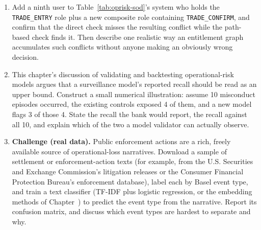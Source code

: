 \documentclass[../ai_in_finance]{subfiles}
\begin{document}
\begin{enumerate}[exercises]
\item Add a ninth user to Table~\ref{tab:oprisk-sod}'s system who holds the \texttt{TRADE\_ENTRY} role plus a new composite role containing \texttt{TRADE\_CONFIRM}, and confirm that the direct check misses the resulting conflict while the path-based check finds it. Then describe one realistic way an entitlement graph accumulates such conflicts without anyone making an obviously wrong decision.
\item This chapter's discussion of validating and backtesting operational-risk models argues that a surveillance model's reported recall should be read as an upper bound. Construct a small numerical illustration: assume 10 misconduct episodes occurred, the existing controls exposed 4 of them, and a new model flags 3 of those 4. State the recall the bank would report, the recall against all 10, and explain which of the two a model validator can actually observe.
\item \textbf{Challenge (real data).} Public enforcement actions are a rich, freely available source of operational-loss narratives. Download a sample of settlement or enforcement-action texts (for example, from the U.S. Securities and Exchange Commission's litigation releases or the Consumer Financial Protection Bureau's enforcement database), label each by Basel event type, and train a text classifier (TF-IDF plus logistic regression, or the embedding methods of Chapter~) to predict the event type from the narrative. Report its confusion matrix, and discuss which event types are hardest to separate and why.
\end{enumerate}

\end{document}
